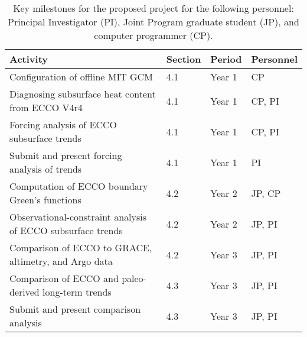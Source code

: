\documentclass[authoryear,round,12pt]{article}
\begin{document}
\begin{table}[!h]
\caption{Key milestones for the proposed project for the following personnel: Principal Investigator (PI), Joint Program graduate student (JP), and computer programmer (CP).}
\label{table:time-table} 
\begin{center}
  \begin{tabular}{llll}
    \hline
    Activity   & Section  & Period & Personnel \\
    \hline
Configuration of offline MIT GCM               & 4.1  & Year 1 & CP \\
Diagnosing subsurface heat content from ECCO V4r4  & 4.1  & Year 1 & CP, PI \\
Forcing analysis of ECCO subsurface trends  & 4.1 & Year 1 & CP, PI \\
Submit and present forcing analysis of trends & 4.1 & Year 1 & PI \\
Computation of ECCO boundary Green's functions & 4.2 & Year 2 & JP, CP \\
Observational-constraint analysis of ECCO subsurface trends  & 4.2 & Year 2 & JP, PI \\
Comparison of ECCO to GRACE, altimetry, and Argo data & 4.2 & Year 3 & JP, PI\\
Comparison of ECCO and paleo-derived long-term trends & 4.3 & Year 3 & JP, PI \\
Submit and present comparison analysis &   4.3  & Year 3 & JP, PI 
\end{tabular}
\end{center}
\end{table}
\end{document}
